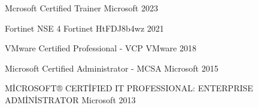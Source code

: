 

\begin{cvhonors}

  \cvhonor
    {Mcrosoft Certified Trainer} %
    {Microsoft} %
    {} %
    {2023} %

  \cvhonor
    {Fortinet NSE 4} %
    {Fortinet} %
    {HtFDJ8b4wz} %
    {2021} %

  \cvhonor
    {VMware Certified Professional - VCP} %
    {VMware} %
    {} %
    {2018} %

  \cvhonor
    {Microsoft Certified Administrator - MCSA } %
    {Microsoft} %
    {} %
    {2015} %

  \cvhonor
    {MİCROSOFT® CERTİFIED IT PROFESSIONAL: ENTERPRISE ADMİNİSTRATOR } %
    {Microsoft} %
    {} %
    {2013} %

  
\end{cvhonors}
